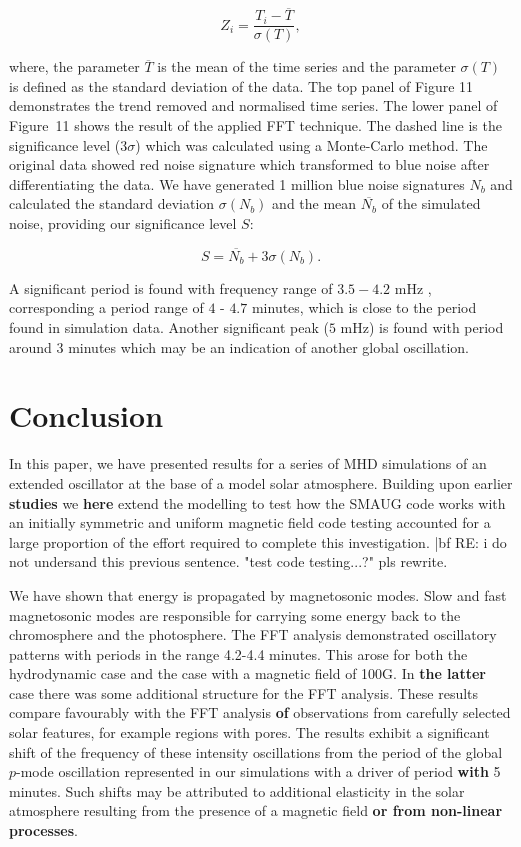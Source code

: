 \documentclass[physics,article,submit,pdftex,moreauthors]{Definitions/mdpi}
\begin{document}
\begin{equation}
	Z_{i} = \frac {T_{i} - \overline{T}}  {\sigma(T)},
	\label{z_score}
\end{equation}


where, the parameter $\overline{T}$ is the mean of the time series and the parameter $\sigma(T)$ is defined as the standard deviation of the data. The top panel of Figure 11 demonstrates the trend removed and normalised time series. The lower panel of Figure~11 shows the result of the applied FFT technique. The dashed line is the significance level ($3 \sigma$) which was calculated using a Monte-Carlo method. The original data showed red noise signature which transformed to blue noise after differentiating the data. We have generated 1 million blue noise signatures $N_{b}$ and calculated the standard deviation $\sigma(N_{b})$ and the mean $\overline{N_{b}}$ of the simulated noise, providing our significance level $S$:


\begin{equation}
    S = \overline{N_{b}} + 3 \sigma(N_{b}).
\end{equation}


A significant period is found with frequency range of $3.5-4.2$ mHz , corresponding a period range of $4$ - $4.7$ minutes, which is close to the period found in simulation data. Another significant peak ($5$ mHz) is found with period around $3$ minutes which may be an indication of another global oscillation.


\section{Conclusion}

In this paper, we have presented results for a series of MHD simulations of an extended oscillator at the base of a model solar atmosphere. Building upon earlier {\bf studies} we {\bf here} extend the modelling to test how the SMAUG code works with an initially symmetric and uniform magnetic field code testing accounted for a large proportion of the effort required to complete this investigation. {|bf RE: i do not undersand this previous sentence. "test code testing...?" pls rewrite.}

We have shown that energy is propagated by magnetosonic modes. Slow and fast magnetosonic modes are responsible for carrying some energy back to the chromosphere and the photosphere. 
The FFT analysis demonstrated oscillatory patterns with periods in the range 4.2-4.4 minutes. This arose for both the hydrodynamic case and the case with a magnetic field of 100G. In {\bf the latter} case there was some additional structure for the FFT analysis. These results compare favourably with the FFT analysis {\bf of} observations from carefully selected solar features, for example regions with pores. The results exhibit a significant shift of the frequency of these intensity oscillations from the period of the global $p$-mode oscillation represented in our simulations with a driver of period {\bf with} 5 minutes. Such shifts may be attributed to additional elasticity in the solar atmosphere resulting from the presence of a magnetic field {\bf or from non-linear processes}. 
\end{document}
